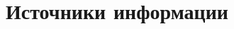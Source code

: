 
\section{Источники информации}
\begin{frame}{\insertsectionhead}
    \printbibliography
\end{frame}
